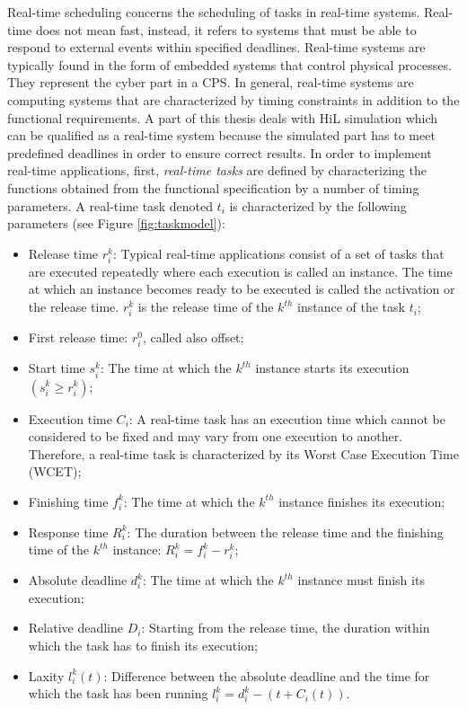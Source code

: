 Real-time scheduling concerns the scheduling of tasks in real-time systems. Real-time does not mean fast, instead, it refers to systems that must be able to respond to external events within specified deadlines. Real-time systems are typically found in the form of embedded systems that control physical processes. They represent the cyber part in a CPS. In general, real-time systems are computing systems that are characterized by timing constraints in addition to the functional requirements. A part of this thesis deals with HiL simulation which can be qualified as a real-time system because the simulated part has to meet predefined deadlines in order to ensure correct results.
In order to implement real-time applications, first, \textit{real-time tasks} are defined by characterizing the functions obtained from the functional specification by a number of timing parameters. A real-time task denoted $t_i$ is characterized by the following parameters (see Figure \ref{fig:taskmodel}):
\begin{itemize}
\item Release time $r^k_i$: Typical real-time applications consist of a set of tasks that are executed repeatedly where each execution is called an instance. The time at which an instance becomes ready to be executed is called the activation or the release time. $r^k_i$ is the release time of the $k^{th}$ instance of the task $t_i$;
\item First release time: $r^0_i$, called also offset;
\item Start time $s^k_i$: The time at which the $k^{th}$ instance starts its execution $(s^k_i \geq r^k_i)$;
\item Execution time $C_i$: A real-time task has an execution time which cannot be considered to be fixed and may vary from one execution to another. Therefore, a real-time task is characterized by its Worst Case Execution Time (WCET);
\item Finishing time $f^k_i$: The time at which the $k^{th}$ instance finishes its execution;
\item Response time $R^k_i$: The duration between the release time and the finishing time of the $k^{th}$ instance: $R^k_i = f^k_i - r^k_i$;
\item Absolute deadline $d^k_i$: The time at which the $k^{th}$ instance must finish its execution;
\item Relative deadline $D_i$: Starting from the release time, the duration within which the task has to finish its execution;
\item Laxity $l^k_i(t)$: Difference between the absolute deadline and the time for which the task has been running $l^k_i=d^k_i-(t+C_i(t))$.
\end{itemize}

